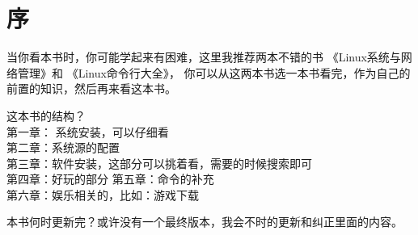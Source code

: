\chapter{序}

当你看本书时，你可能学起来有困难，这里我推荐两本不错的书 《Linux系统与网络管理》\citet{book2}和 《Linux命令行大全》\citet{book1}，
你可以从这两本书选一本书看完，作为自己的前置的知识，然后再来看这本书。


这本书的结构？\\
第一章： 系统安装，可以仔细看\\
第二章：系统源的配置\\
第三章：软件安装，这部分可以挑着看，需要的时候搜索即可\\
第四章：好玩的部分
第五章：命令的补充\\
第六章：娱乐相关的，比如：游戏下载

本书何时更新完？或许没有一个最终版本，我会不时的更新和纠正里面的内容。
